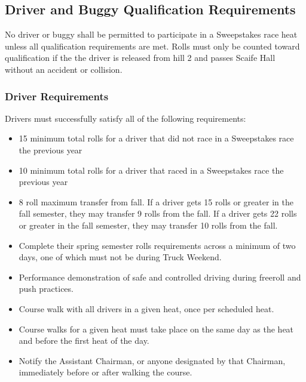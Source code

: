 \subsection{Driver and Buggy Qualification Requirements}
	No driver or buggy shall be permitted to participate in a Sweepstakes race heat unless all qualification requirements are met. Rolls must only be counted toward qualification if the the driver is released from hill 2 and passes Scaife Hall
\label{sec:DriverAndBuggyQualificationRequirements}
	without an accident or collision.

\subsubsection{Driver Requirements}
Drivers must successfully satisfy all of the following requirements:

	\begin{itemize}

		\item 15 minimum total rolls for a driver that did not race in a Sweepstakes race the previous year

		\item 10 minimum total rolls for a driver that raced in a Sweepstakes race the previous year

		\item 8 roll maximum transfer from fall. If a driver gets 15 rolls or greater in the fall semester, they may transfer 9 rolls from the fall. If a driver gets 22 rolls or greater in the fall semester, they may transfer 10 rolls from the fall.

		\item Complete their spring semester rolls requirements across a minimum of two days, one of which must not be during Truck Weekend.

		\item Performance demonstration of safe and controlled driving during freeroll and push practices.

		\item Course walk with all drivers in a given heat, once per scheduled heat.

		\item Course walks for a given heat must take place on the same day as the heat and before the first heat of the day.

		\item Notify the Assistant Chairman, or anyone designated by that Chairman, immediately before or after walking the course.

	\end{itemize}

